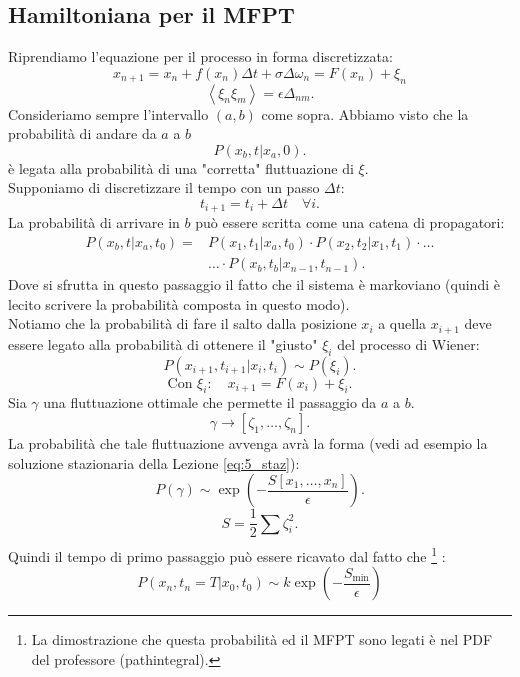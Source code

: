 \subsection{Hamiltoniana per il MFPT}%
\label{sub:Hamiltoniana per il MFPT}
Riprendiamo l'equazione per il processo in forma discretizzata:
\begin{equation}
    x_{n+1} = x_n + f(x_n) \Delta t + \sigma \Delta\omega_n = F(x_n) + \xi_n
    \label{eq:Ham_start}
\end{equation}
\[
    \left<\xi_n\xi_m\right> = \epsilon\Delta_{nm}
.\] 
Consideriamo sempre l'intervallo $(a,b)$ come sopra. Abbiamo visto che la probabilità di andare da $a$ a $b$ 
\[
    P\left(x_b,t|x_a,0\right)
.\] 
è legata alla probabilità di una "corretta" fluttuazione di $\xi$. \\
Supponiamo di discretizzare il tempo con un passo $\Delta t$:
\[
    t_{i+1} = t_i + \Delta t 	\quad \forall i
.\] 
La probabilità di arrivare in $b$ può essere scritta come una catena di propagatori:
\[\begin{aligned}
    P\left(x_b,t|x_a,t_0\right)=&P\left(x_1,t_1|x_a,t_0\right)\cdot P\left(x_2,t_2|x_1,t_1\right)\cdot \ldots \\
				&\ldots \cdot P\left(x_b,t_b|x_{n-1},t_{n-1}\right)
.\end{aligned}\]
Dove si sfrutta in questo passaggio il fatto che il sistema è markoviano (quindi è lecito scrivere la probabilità composta in questo modo).\\
Notiamo che la probabilità di fare il salto dalla posizione $x_{i}$ a quella $x_{i+1}$ deve essere legato alla probabilità di ottenere il "giusto" $\xi_i$  del processo di Wiener:
\[
    P\left(x_{i+1}, t_{i+1}|x_i,t_i\right) \sim P(\xi_i) 
.\] 
\[
    \text{Con } \xi_i: \quad x_{i+1} = F(x_i) + \xi_i
.\] 
Sia $\gamma$ una fluttuazione ottimale che permette il passaggio da $a$ a $b$.
\[
	\gamma \to \left[\zeta_1, \ldots, \zeta_n\right]
.\] 
La probabilità che tale fluttuazione avvenga avrà la forma (vedi ad esempio la soluzione stazionaria della Lezione \ref{eq:5_staz}):
\[
    P(\gamma) \sim \exp\left(-\frac{S\left[x_1,\ldots,x_n\right]}{\epsilon}\right)
.\] 
\[
    S = \frac{1}{2}\sum_{}^{} \zeta^2_i
.\] 
Quindi il tempo di primo passaggio può essere ricavato dal fatto che
\footnote{La dimostrazione che questa probabilità ed il MFPT sono legati è nel PDF del professore (pathintegral).}
:
\begin{equation}
    P\left(x_n,t_n = T|x_0,t_0\right) \sim k \exp\left(-\frac{S_{\text{min}}}{\epsilon}\right)
    \label{eq:mftp_azione}
\end{equation}
